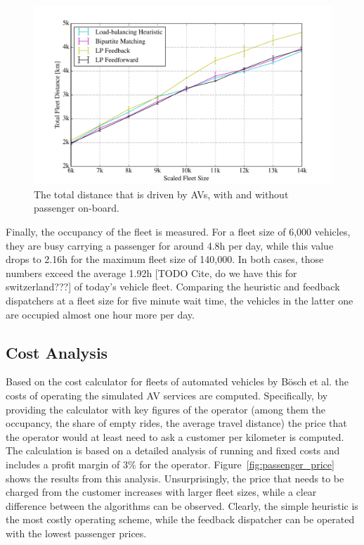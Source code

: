 \begin{figure}
\includegraphics[width=1.0\textwidth]{figures/total_distance.pdf}
\caption{The total distance that is driven by AVs, with and without passenger on-board.}
\label{fig:total_distance}
\end{figure}

Finally, the occupancy of the fleet is measured. For a fleet size of 6,000
vehicles, they are busy carrying a passenger for around 4.8h per day, while
this value drops to 2.16h for the maximum fleet size of 140,000. In both cases,
those numbers exceed the average 1.92h [TODO Cite, do we have this for switzerland???] of today's vehicle fleet.
Comparing the heuristic and feedback dispatchers at a fleet size for five minute
wait time, the vehicles in the latter one are occupied almost one hour more per day.

\subsection{Cost Analysis}
\label{sec:cost_analysis}

Based on the cost calculator for fleets of automated vehicles by Bösch et al. \cite{cost_paper}
 the costs of operating the simulated
AV services are computed. Specifically, by providing the calculator with key
figures of the operator (among them the occupancy, the share of empty rides, the
average travel distance) the price that the operator would at least need to ask
a customer per kilometer is computed. The calculation
is based on a detailed analysis of running and fixed costs and includes a
profit margin of 3\% for the operator. Figure~\ref{fig:passenger_price}
shows the results from this analysis. Unsurprisingly, the price that needs to be
charged from the customer increases with larger fleet sizes, while a clear difference
between the algorithms can be observed. Clearly, the simple heuristic is the most
costly operating scheme, while the feedback dispatcher can be operated with the
lowest passenger prices.

